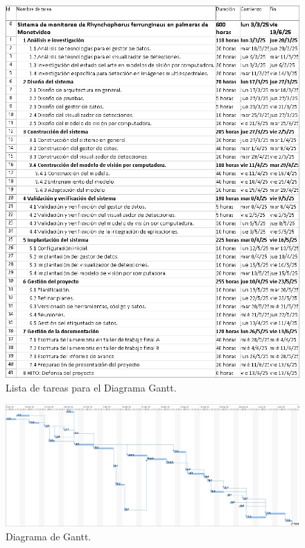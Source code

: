 \documentclass[
11pt, %
]{charter}
\begin{document}
\begin{figure}[htpb]
  \centering
  \includegraphics[height=.7\textheight]{./Figuras/lista-actividades.png}
  \caption{Lista de tareas para el Diagrama Gantt.}
  \label{fig:diagGanttAct}
\end{figure}

\begin{landscape}
  \centering
  \vspace*{\fill}
  \begin{figure}[htpb]
    \centering
    \includegraphics[height=.65\textheight]{./Figuras/gantt.jpg}
    \caption{Diagrama de Gantt.}
    \label{fig:diagGantt}
  \end{figure}
  \vfill
\end{landscape}
\end{document}
